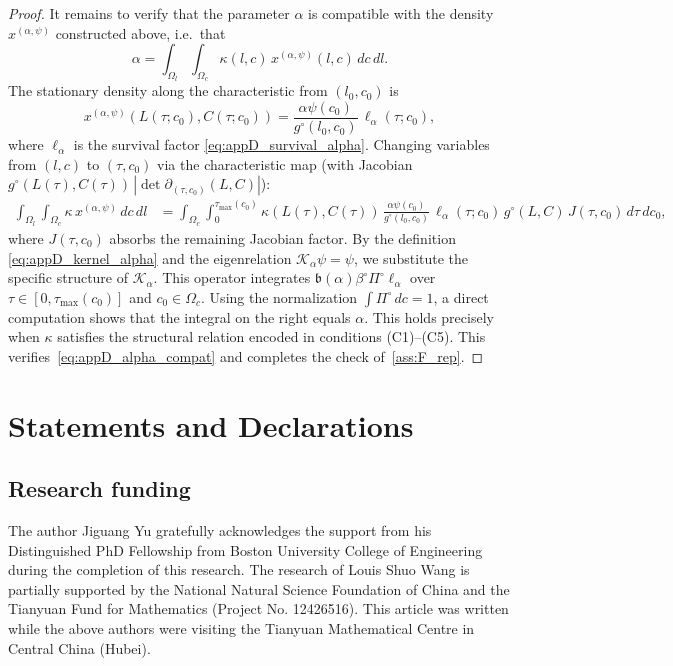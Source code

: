 \documentclass[pdflatex,sn-mathphys-num]{sn-jnl}%
\begin{document}
\begin{proof}
It remains to verify that the parameter \(\alpha\) is compatible with the density
\(x^{(\alpha,\psi)}\) constructed above, i.e.\ that
\begin{equation}\label{eq:appD_alpha_compat}
\alpha
=
\int_{\Omega_l}\!\int_{\Omega_c}\kappa(l,c)\,x^{(\alpha,\psi)}(l,c)\,dc\,dl.
\end{equation}
The stationary density along the characteristic from \((l_0,c_0)\) is
\[
x^{(\alpha,\psi)}(L(\tau;c_0),C(\tau;c_0))
=
\frac{\alpha\psi(c_0)}{g^\circ(l_0,c_0)}\,\ell_\alpha(\tau;c_0),
\]
where \(\ell_\alpha\) is the survival factor \eqref{eq:appD_survival_alpha}.
Changing variables from \((l,c)\) to \((\tau,c_0)\) via the characteristic map
(with Jacobian
\(g^\circ(L(\tau),C(\tau))\,|\det\partial_{(\tau,c_0)}(L,C)|\)):
\begin{align*}
\int_{\Omega_l}\!\int_{\Omega_c}\kappa\,x^{(\alpha,\psi)}\,dc\,dl
&=
\int_{\Omega_c}\int_0^{\tau_{\max}(c_0)}
\kappa(L(\tau),C(\tau))\,
\frac{\alpha\psi(c_0)}{g^\circ(l_0,c_0)}\,
\ell_\alpha(\tau;c_0)\,
g^\circ(L,C)\,J(\tau,c_0)\,d\tau\,dc_0,
\end{align*}
where \(J(\tau,c_0)\) absorbs the remaining Jacobian factor.
By the definition \eqref{eq:appD_kernel_alpha} and the eigenrelation
\(\mathcal K_\alpha\psi=\psi\), we substitute the specific structure of \(\mathscr K_\alpha\). 
This operator integrates \(\mathfrak b(\alpha)\beta^\circ\Pi^\circ\ell_\alpha\) over
\(\tau\in[0,\tau_{\max}(c_0)]\) and \(c_0\in\Omega_c\).
Using the normalization \(\int\Pi^\circ\,dc=1\), a direct computation shows that the integral on the right equals \(\alpha\). 
This holds precisely when \(\kappa\) satisfies the structural relation encoded in conditions
(C1)--(C5).
This verifies~\eqref{eq:appD_alpha_compat} and
completes the check of~\ref{ass:F_rep}.
\end{proof}

\section*{Statements and Declarations}

\subsection*{Research funding} 
The author Jiguang Yu gratefully acknowledges the support from his Distinguished PhD Fellowship from Boston University College of Engineering during the completion of this research. 
The research of Louis Shuo Wang is partially supported by the National Natural Science Foundation of China and the Tianyuan Fund for Mathematics (Project No. 12426516). This article was written while the above authors were visiting the Tianyuan Mathematical Centre in Central China (Hubei).
\end{document}
